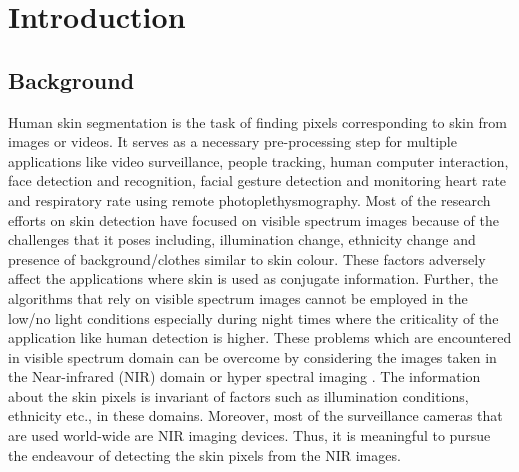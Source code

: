 \documentclass[runningheads]{llncs}
\begin{document}
\section{Introduction}
\subsection{Background}
Human skin segmentation is the task of finding pixels corresponding to skin from images or videos. It serves as a necessary pre-processing step for multiple applications like video surveillance,
people tracking, human computer interaction, face detection and recognition, facial gesture detection and monitoring heart rate and respiratory rate \cite{prathosh2017estimation,mahmoodi2017high,chen2016skin,mahmoodi2016comprehensive} using remote photoplethysmography.  Most of the research efforts on skin detection have focused on visible spectrum images because of the challenges that it poses including, illumination change, ethnicity change and presence of background/clothes similar to skin colour. These factors adversely affect the applications where skin is used as conjugate information. Further, the algorithms that rely on visible spectrum images cannot be employed in the low/no light conditions especially during night times where the criticality of the application like human detection is higher. 
These problems which are  encountered in visible spectrum domain can be overcome by considering the images taken in the Near-infrared  (NIR) domain \cite{kong2005recent} or hyper spectral imaging \cite{pan2003face}. The information about the skin pixels is invariant of factors such as illumination conditions, ethnicity etc., in these domains. Moreover, most of the surveillance cameras that are used world-wide are NIR imaging devices. Thus, it is meaningful to pursue  the endeavour of detecting the skin pixels from the NIR images. 
\end{document}
